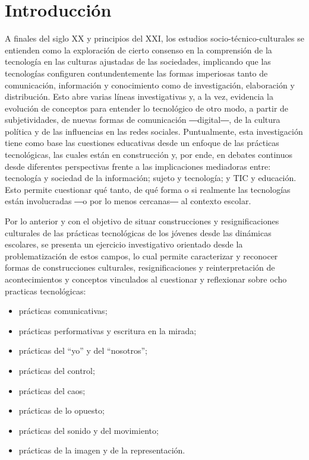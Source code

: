 \documentclass{textolivre}
\begin{document}
\begin{polyabstract}
\begin{english}
\begin{abstract}
\end{abstract}
\end{english}

\end{polyabstract}


\section{Introducción}\label{sec-intro}
A finales del siglo XX y principios del XXI, los estudios socio-técnico-culturales \cite{levy_cibercultura._2007} se entienden como la exploración de cierto consenso en la comprensión de la tecnología en las culturas ajustadas de las sociedades, implicando que las tecnologías configuren contundentemente las formas imperiosas tanto de comunicación, información y conocimiento como de investigación, elaboración y distribución. Esto abre varias líneas investigativas y, a la vez, evidencia la evolución de conceptos para entender lo tecnológico de otro modo, a partir de subjetividades, de nuevas formas de comunicación ―digital―, de la cultura política y de las influencias en las redes sociales. Puntualmente, esta investigación tiene como base las cuestiones educativas desde un enfoque de las prácticas tecnológicas, las cuales están en construcción y, por ende, en debates continuos desde diferentes perspectivas frente a las implicaciones mediadoras entre: tecnología y sociedad de la información; sujeto y tecnología; y TIC y educación. Esto permite cuestionar qué tanto, de qué forma o si realmente las tecnologías están involucradas ―o por lo menos cercanas― al contexto escolar.

Por lo anterior y con el objetivo de situar construcciones y resignificaciones culturales de las prácticas tecnológicas de los jóvenes desde las dinámicas escolares, se presenta un ejercicio investigativo orientado desde la problematización de estos campos, lo cual permite caracterizar y reconocer formas de construcciones culturales, resignificaciones y reinterpretación de acontecimientos y conceptos vinculados al cuestionar y reflexionar sobre ocho practicas tecnológicas:

\begin{itemize}
    \item prácticas comunicativas;
    \item prácticas performativas y escritura en la mirada;
    \item prácticas del “yo” y del “nosotros”;
    \item prácticas del control;
    \item prácticas del caos;
    \item prácticas de lo opuesto;
    \item prácticas del sonido y del movimiento;
    \item prácticas de la imagen y de la representación.
\end{itemize}
\end{document}
